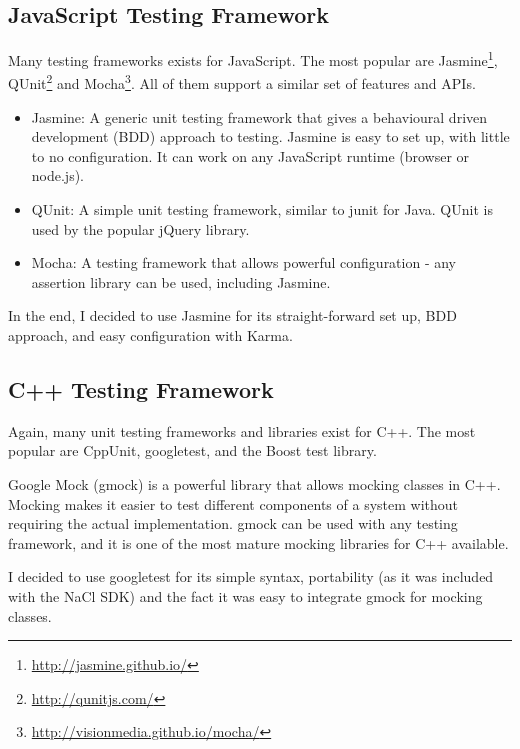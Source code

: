 
\subsection{JavaScript Testing Framework} %
\label{sub:js_test_framework}
Many testing frameworks exists for JavaScript. The most popular are Jasmine\footnote{\url{http://jasmine.github.io/}}, QUnit\footnote{\url{http://qunitjs.com/}} and Mocha\footnote{\url{http://visionmedia.github.io/mocha/}}. All of them support a similar set of features and APIs. 

\begin{itemize}
	\item Jasmine: A generic unit testing framework that gives a behavioural driven development (BDD) approach to testing. Jasmine is easy to set up, with little to no configuration. It can work on any JavaScript runtime (browser or node.js).
	\item QUnit: A simple unit testing framework, similar to junit for Java. QUnit is used by the popular jQuery library. 
	\item Mocha: A testing framework that allows powerful configuration - any assertion library can be used, including Jasmine.
\end{itemize}

In the end, I decided to use Jasmine for its straight-forward set up, BDD approach, and easy configuration with Karma.


\subsection{C++ Testing Framework} %
\label{sub:cpp_testing}
Again, many unit testing frameworks and libraries exist for C++. The most popular are CppUnit, googletest, and the Boost test library.

Google Mock (gmock) is a powerful library that allows mocking classes in C++. Mocking makes it easier to test different components of a system without requiring the actual implementation. gmock can be used with any testing framework, and it is one of the most mature mocking libraries for C++ available.

I decided to use googletest for its simple syntax, portability (as it was included with the NaCl SDK) and the fact it was easy to integrate gmock for mocking classes.


